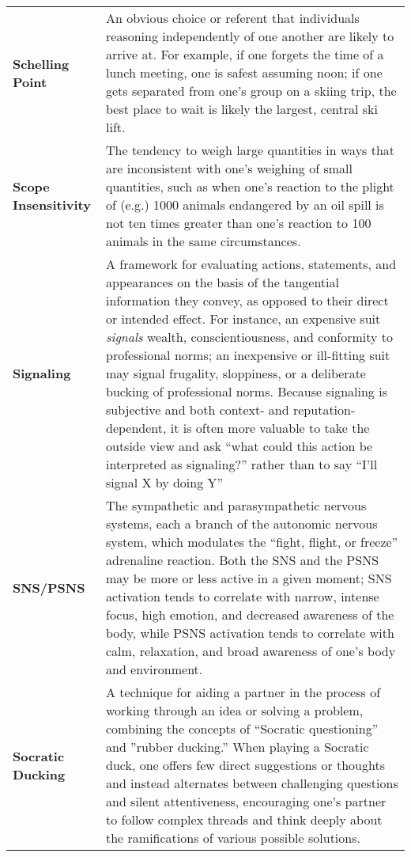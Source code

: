 \begin{longtable} { p{} p{} }
\textbf{Schelling Point} & An obvious choice or referent that individuals reasoning independently of one another are likely to arrive at.  For example, if one forgets the time of a lunch meeting, one is safest assuming noon; if one gets separated from one's group on a skiing trip, the best place to wait is likely the largest, central ski lift.\\

\textbf{Scope Insensitivity} & The tendency to weigh large quantities in ways that are inconsistent with one's weighing of small quantities, such as when one's reaction to the plight of (e.g.) 1000 animals endangered by an oil spill is not ten times greater than one's reaction to 100 animals in the same circumstances.\\

\textbf{Signaling} & A framework for evaluating actions, statements, and appearances on the basis of the tangential information they convey, as opposed to their direct or intended effect.  For instance, an expensive suit \emph{signals} wealth, conscientiousness, and conformity to professional norms; an inexpensive or ill-fitting suit may signal frugality, sloppiness, or a deliberate bucking of professional norms.  Because signaling is subjective and both context- and reputation-dependent, it is often more valuable to take the outside view and ask ``what could this action be interpreted as signaling?'' rather than to say ``I'll signal X by doing Y''\\

\textbf{SNS/PSNS} & The sympathetic and parasympathetic nervous systems, each a branch of the autonomic nervous system, which modulates the ``fight, flight, or freeze'' adrenaline reaction.  Both the SNS and the PSNS may be more or less active in a given moment; SNS activation tends to correlate with narrow, intense focus, high emotion, and decreased awareness of the body, while PSNS activation tends to correlate with calm, relaxation, and broad awareness of one's body and environment.\\

\textbf{Socratic Ducking} & A technique for aiding a partner in the process of working through an idea or solving a problem, combining the concepts of ``Socratic questioning'' and ''rubber ducking.''  When playing a Socratic duck, one offers few direct suggestions or thoughts and instead alternates between challenging questions and silent attentiveness, encouraging one's partner to follow complex threads and think deeply about the ramifications of various possible solutions.\\


\end{longtable}
